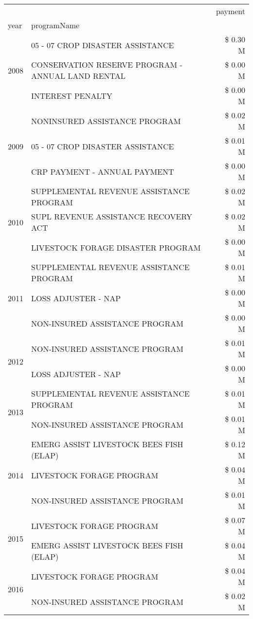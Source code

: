 \begin{tabular}{llr}
\toprule
 &  & payment \\
year & programName &  \\
\midrule
\multirow[t]{3}{*}{2008} & 05 - 07 CROP DISASTER ASSISTANCE & \$ 0.30 M \\
 & CONSERVATION RESERVE PROGRAM - ANNUAL LAND RENTAL & \$ 0.00 M \\
 & INTEREST PENALTY & \$ 0.00 M \\
\cline{1-3}
\multirow[t]{3}{*}{2009} & NONINSURED ASSISTANCE PROGRAM & \$ 0.02 M \\
 & 05 - 07 CROP DISASTER ASSISTANCE & \$ 0.01 M \\
 & CRP PAYMENT - ANNUAL PAYMENT & \$ 0.00 M \\
\cline{1-3}
\multirow[t]{3}{*}{2010} & SUPPLEMENTAL REVENUE ASSISTANCE PROGRAM & \$ 0.02 M \\
 & SUPL REVENUE ASSISTANCE RECOVERY ACT & \$ 0.02 M \\
 & LIVESTOCK FORAGE DISASTER  PROGRAM & \$ 0.00 M \\
\cline{1-3}
\multirow[t]{3}{*}{2011} & SUPPLEMENTAL REVENUE ASSISTANCE PROGRAM & \$ 0.01 M \\
 & LOSS ADJUSTER - NAP & \$ 0.00 M \\
 & NON-INSURED ASSISTANCE PROGRAM & \$ 0.00 M \\
\cline{1-3}
\multirow[t]{2}{*}{2012} & NON-INSURED ASSISTANCE PROGRAM & \$ 0.01 M \\
 & LOSS ADJUSTER - NAP & \$ 0.00 M \\
\cline{1-3}
\multirow[t]{2}{*}{2013} & SUPPLEMENTAL REVENUE ASSISTANCE PROGRAM & \$ 0.01 M \\
 & NON-INSURED ASSISTANCE PROGRAM & \$ 0.01 M \\
\cline{1-3}
\multirow[t]{3}{*}{2014} & EMERG ASSIST LIVESTOCK BEES FISH (ELAP) & \$ 0.12 M \\
 & LIVESTOCK FORAGE PROGRAM & \$ 0.04 M \\
 & NON-INSURED ASSISTANCE PROGRAM & \$ 0.01 M \\
\cline{1-3}
\multirow[t]{2}{*}{2015} & LIVESTOCK FORAGE PROGRAM & \$ 0.07 M \\
 & EMERG ASSIST LIVESTOCK BEES FISH (ELAP) & \$ 0.04 M \\
\cline{1-3}
\multirow[t]{3}{*}{2016} & LIVESTOCK FORAGE PROGRAM                      & \$ 0.04 M \\
 & NON-INSURED ASSISTANCE PROGRAM                & \$ 0.02 M \\

\end{tabular}

